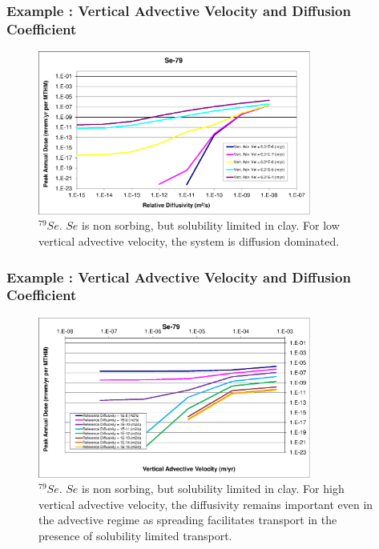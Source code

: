 \begin{frame}[c]
  \frametitle{Example : Vertical Advective Velocity and Diffusion Coefficient}
\begin{figure}[htp!]
\centering
\includegraphics[width=0.8\textwidth]{Se-79.eps}
\caption{$^{79}Se$.  $Se$ is non sorbing, but solubility limited in clay.  For low vertical advective velocity, the system is diffusion dominated.}
\label{fig:VAdvVelSe79}
\end{figure}
\end{frame}

\begin{frame}[c]
  \frametitle{Example : Vertical Advective Velocity and Diffusion Coefficient}
\begin{figure}[ht!]
\centering
\includegraphics[width=0.8\textwidth]{Se-79-VAdvVel.eps}
\caption{$^{79}Se$.
$Se$ is non sorbing, but solubility limited in clay.
For high vertical advective 
velocity, the diffusivity remains important even in the advective regime as 
spreading facilitates transport in the presence of solubility limited 
transport.} 
\label{fig:VAdvVelSe79VAdvVel}
\end{figure}
\end{frame}


